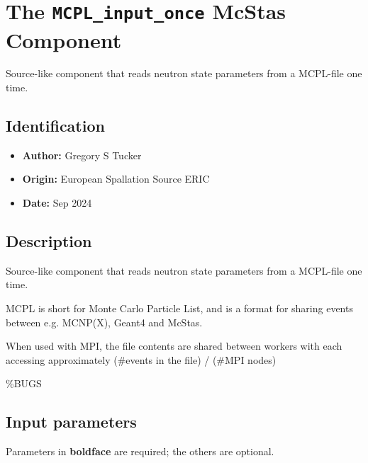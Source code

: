 \section{The \texttt{MCPL\_input\_once} McStas Component}
Source-like component that reads neutron state parameters from a MCPL-file one time.

\subsection*{Identification}
\begin{itemize}
  \item \textbf{Author:} Gregory S Tucker
  \item \textbf{Origin:} European Spallation Source ERIC
  \item \textbf{Date:} Sep 2024
\end{itemize}

\subsection*{Description}
Source-like component that reads neutron state parameters from a MCPL-file one time.

MCPL is short for Monte Carlo Particle List, and is a format for sharing events between e.g. MCNP(X), Geant4 and McStas.

When used with MPI, the file contents are shared between workers with each accessing approximately (\#events in the file) / (\#MPI nodes)

\%BUGS

\subsection*{Input parameters}
Parameters in \textbf{boldface} are required; the others are optional.

